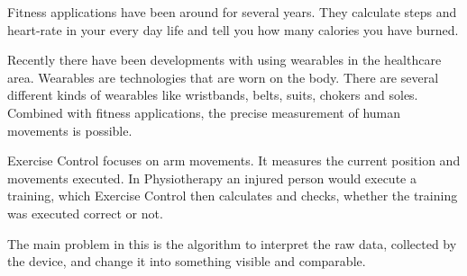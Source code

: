 
Fitness applications have been around for several years. They calculate steps and heart-rate in your every day life and tell you how many calories you have burned.

Recently there have been developments with using wearables in the healthcare area. Wearables are technologies that are worn on the body. There are several different kinds of wearables like wristbands, belts, suits, chokers and soles. Combined with fitness applications, the precise measurement of human movements is possible.

Exercise Control focuses on arm movements. It measures the current position and movements executed. In Physiotherapy an injured person would execute a training, which Exercise Control then calculates and checks, whether the training was executed correct or not.

The main problem in this is the algorithm to interpret the raw data, collected by the device, and change it into something visible and comparable.
